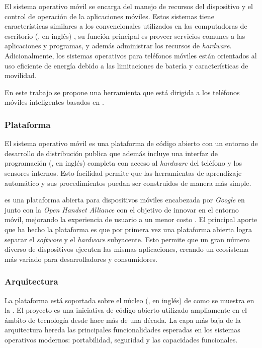 El sistema operativo móvil se encarga del manejo de recursos del dispositivo
y el control de operación de la aplicaciones móviles. Estos sistemas
tiene características similares a los convencionales utilizados en
las computadoras de escritorio (, en inglés) , su función
principal es proveer servicios comunes a las aplicaciones y programas,
y además administrar los recursos de \emph{hardware}. Adicionalmente,
los sistemas operativos para teléfonos móviles están orientados al
uso eficiente de energía debido a las limitaciones de batería y características
de movilidad. 

En este trabajo se propone una herramienta que está dirigida a los
teléfonos móviles inteligentes basados en .

\subsubsection{Plataforma}

El sistema operativo móvil  es una plataforma de código
abierto con un entorno de desarrollo de distribución publica que además
incluye una interfaz de programación (, en inglés) completa
con acceso al \emph{hardware} del teléfono y los sensores internos.
Esto facilidad permite que las herramientas de aprendizaje automático
y sus procedimientos puedan ser construidos de manera más simple. 

 es una plataforma abierta para dispositivos móviles
encabezada por \emph{Google} en junto con la \emph{Open Handset Alliance
\cite{OHA2008}} con el objetivo de innovar en el entorno móvil, mejorando
la experiencia de usuario a un menor costo \cite{Gargenta2014}. El
principal aporte que ha hecho la plataforma es que por primera vez
una plataforma abierta logra separar el \emph{software} y el \emph{hardware}
subyacente. Esto permite que un gran número diverso de dispositivos
ejecuten las mismas aplicaciones, creando un ecosistema más variado
para desarrolladores y consumidores. 

\subsubsection{Arquitectura}

La plataforma  está soportada sobre el núcleo (,
en inglés) de  como se muestra en la .
El proyecto  es una iniciativa de código abierto utilizado
ampliamente en el ámbito de tecnología desde hace más de una década.
La capa más baja de la arquitectura hereda las principales funcionalidades
esperadas en los sistemas operativos modernos: portabilidad, seguridad
y las capacidades funcionales.

